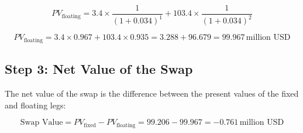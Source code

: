 \documentclass[12pt,letterpaper, onecolumn]{exam}
\begin{document}
\begin{questions}
\begin{solution}
\[
PV_{\text{floating}} = 3.4 \times \frac{1}{(1 + 0.034)^1} + 103.4 \times \frac{1}{(1 + 0.034)^2}
\]

\[
PV_{\text{floating}} = 3.4 \times 0.967 + 103.4 \times 0.935 = 3.288 + 96.679 = 99.967 \, \text{million USD}
\]

\subsection*{Step 3: Net Value of the Swap}
The net value of the swap is the difference between the present values of the fixed and floating legs:

\[
\text{Swap Value} = PV_{\text{fixed}} - PV_{\text{floating}} = 99.206 - 99.967 = -0.761 \, \text{million USD}
\]

\end{solution}
    
\end{questions}
\end{document}
